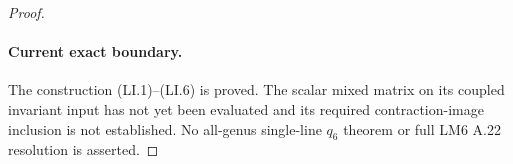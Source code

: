 \begin{proof}
\paragraph{Current exact boundary.}
The construction (LI.1)--(LI.6) is proved. The scalar
mixed matrix on its coupled invariant input has not
yet been evaluated and its required contraction-image
inclusion is not established. No all-genus single-line
$q_6$ theorem or full LM6 A.22 resolution is asserted.

\end{proof}
